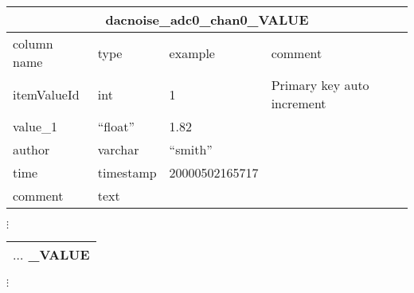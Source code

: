 \begin{slide*}
\begin{table}[htbp]
\begin{center}
\begin{tabular}{|l|l|l|l|} \hline
\multicolumn{4}{|c|}{dacnoise\_adc0\_chan0\_VALUE} \\ \hline
column name & type & example & comment\\ \hline\hline
itemValueId    & int        &  1       & Primary key auto increment\\
value\_1       & ``float''   &  1.82    &  \\
author         & varchar    & ``smith''& \\
time           & timestamp  & 20000502165717 & \\ 
comment        & text       &                & \\ \hline
\end{tabular}
\end{center}
\end{table}


\centerline{$\vdots$}


\begin{table}[htbp]
\begin{center}
\begin{tabular}{|l|l|l|l|} \hline
\multicolumn{4}{|c|}{\hspace*{0.8in} $\ldots$ \_VALUE \hspace*{0.8in}} \\ \hline
\end{tabular}
\end{center}
\end{table}

\centerline{$\vdots$}

\end{slide*}

